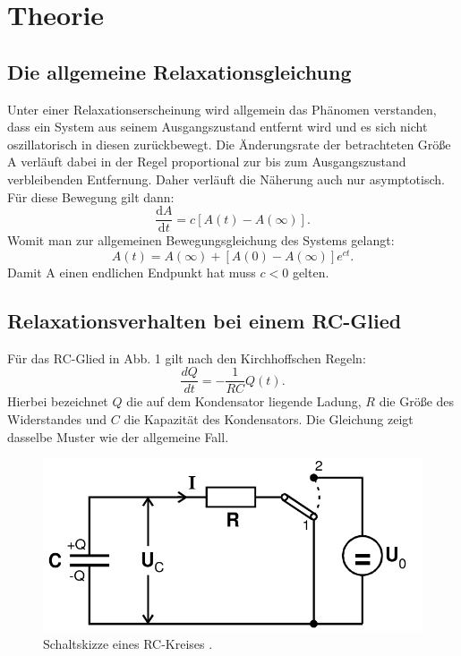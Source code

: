 \section{Theorie}
\label{sec:Theorie}
\subsection{Die allgemeine Relaxationsgleichung}
Unter einer Relaxationserscheinung wird allgemein das Phänomen verstanden, dass
 ein System aus seinem Ausgangszustand entfernt wird und es sich nicht oszillatorisch
 in diesen zurückbewegt. Die Änderungsrate der betrachteten Größe A verläuft dabei
 in der Regel proportional zur bis zum Ausgangszustand verbleibenden Entfernung. Daher
  verläuft die Näherung auch nur asymptotisch. Für diese
 Bewegung gilt dann:
 \begin{equation}
   \frac{\text{d}A}{\text{d}t} = c[A(t)-A(\infty)]\text{.}
 \end{equation}
Womit man zur allgemeinen Bewegungsgleichung des Systems gelangt:
\begin{equation}
  A(t) = A(\infty)+[A(0)-A(\infty)]e^{ct}\text{.}
\end{equation}
Damit A einen endlichen Endpunkt hat muss $ c < 0$ gelten.

\subsection{Relaxationsverhalten bei einem RC-Glied}

Für das RC-Glied in Abb. 1 gilt nach den Kirchhoffschen Regeln:
\begin{equation}
  \frac{dQ}{dt} = -\frac{1}{RC}Q(t)\text{.}
\end{equation}
Hierbei bezeichnet $Q$ die auf dem Kondensator liegende
 Ladung, $R$ die Größe des Widerstandes und $C$ die Kapazität des Kondensators.
Die Gleichung zeigt dasselbe Muster wie der allgemeine Fall.
\begin{figure}[H]
  \centering
  \includegraphics[width=\linewidth-200pt,height=\textheight-200pt,keepaspectratio]{content/RC_Kreis1.png}
  \caption{Schaltskizze eines RC-Kreises \cite{V353}.}
  \label{fig:RC_Kreis1}
\end{figure}

